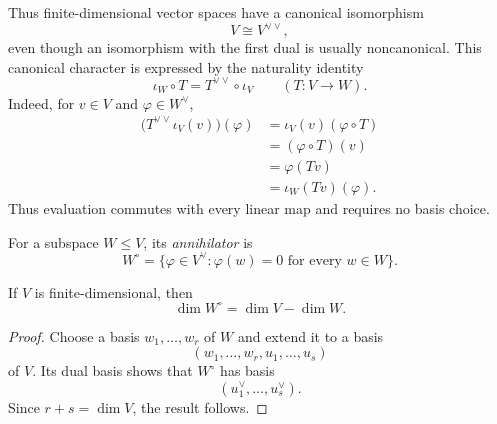 Thus finite-dimensional vector spaces have a canonical isomorphism
\[
V\cong V^{\vee\vee},
\]
even though an isomorphism with the first dual is usually noncanonical.
This canonical character is expressed by the naturality identity
\begin{equation}\label{eq:double-dual-naturality}
\iota_W\circ T=T^{\vee\vee}\circ\iota_V
\qquad(T:V\to W).
\end{equation}
Indeed, for \(v\in V\) and \(\varphi\in W^\vee\),
\[
\begin{aligned}
\bigl(T^{\vee\vee}\iota_V(v)\bigr)(\varphi)
&=\iota_V(v)(\varphi\circ T)\\
&=(\varphi\circ T)(v)\\
&=\varphi(Tv)\\
&=\iota_W(Tv)(\varphi).
\end{aligned}
\]
Thus evaluation commutes with every linear map and requires no basis choice.

\begin{definition}
For a subspace \(W\leq V\), its \emph{annihilator} is
\[
W^\circ=\{\varphi\in V^\vee:\varphi(w)=0\text{ for every }w\in W\}.
\]
\end{definition}

\begin{proposition}
If \(V\) is finite-dimensional, then
\[
\dim W^\circ=\dim V-\dim W.
\]
\end{proposition}
\begin{proof}
Choose a basis \(w_1,\ldots,w_r\) of \(W\) and extend it to a basis
\[
(w_1,\ldots,w_r,u_1,\ldots,u_s)
\]
of \(V\).  Its dual basis shows that \(W^\circ\) has basis
\[
(u_1^\vee,\ldots,u_s^\vee).
\]
Since \(r+s=\dim V\), the result follows.
\end{proof}

